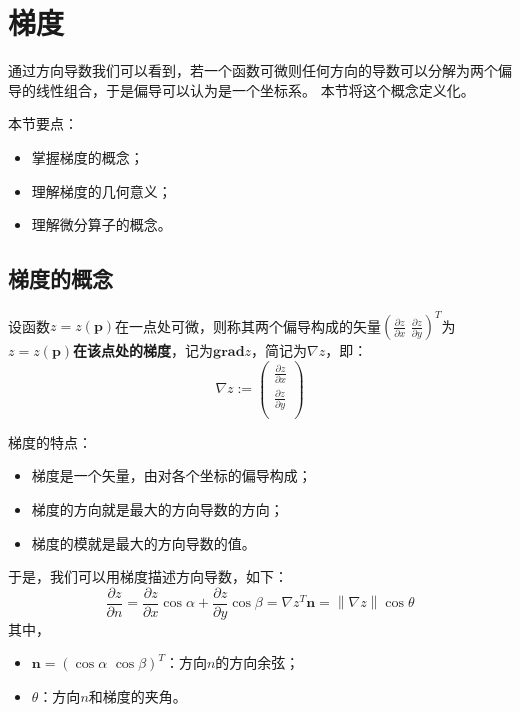 \section{梯度}

通过方向导数我们可以看到，若一个函数可微则任何方向的导数可以分解为两个偏导的线性组合，于是偏导可以认为是一个坐标系。
本节将这个概念定义化。

本节要点：
\begin{itemize}
    \item 掌握梯度的概念；
    \item 理解梯度的几何意义；
    \item 理解微分算子的概念。
\end{itemize}

\subsection{梯度的概念}

\begin{definition}[梯度]
设函数$z=z\left( \boldsymbol{p} \right) $在一点处可微，则称其两个偏导构成的矢量$\left( \frac{\partial z}{\partial x}\,\,\frac{\partial z}{\partial y} \right) ^T$为{\bf $z=z\left( \boldsymbol{p} \right) $在该点处的梯度}，记为$\mathbf{grad}z$，简记为$\nabla z$，即：
\[
\nabla z:=\left( \begin{array}{c}
	\frac{\partial z}{\partial x}\\
	\frac{\partial z}{\partial y}\\
\end{array} \right)
\]
\end{definition}

梯度的特点：
\begin{itemize}
    \item 梯度是一个矢量，由对各个坐标的偏导构成；
    \item 梯度的方向就是最大的方向导数的方向；
    \item 梯度的模就是最大的方向导数的值。
\end{itemize}

于是，我们可以用梯度描述方向导数，如下：
\[
\frac{\partial z}{\partial n}=\frac{\partial z}{\partial x}\cos \alpha +\frac{\partial z}{\partial y}\cos \beta =\nabla z^T\mathbf{n}=\left\| \nabla z \right\| \cos \theta
\]
其中，
\begin{itemize}
    \item $\mathbf{n}=\left( \cos \alpha \,\,\cos \beta \right) ^T$：方向$n$的方向余弦；
    \item $\theta $：方向$n$和梯度的夹角。
\end{itemize}

